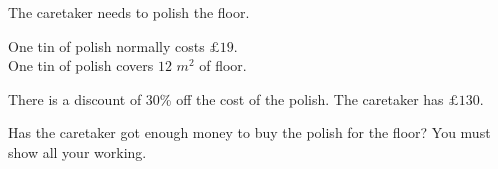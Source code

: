 \begin{enumerate}
\begin{figure}[H]
      \end{figure}
      The caretaker needs to polish the floor.\par
      One tin of polish normally costs $\pounds 19$.\\
      One tin of polish covers $12$ $m^2$ of floor.\par
      There is a discount of 30\% off the cost of the polish. The caretaker has $\pounds 130$.\par 
      Has the caretaker got enough money to buy the polish for the floor? You must show all your working.
\end{enumerate}